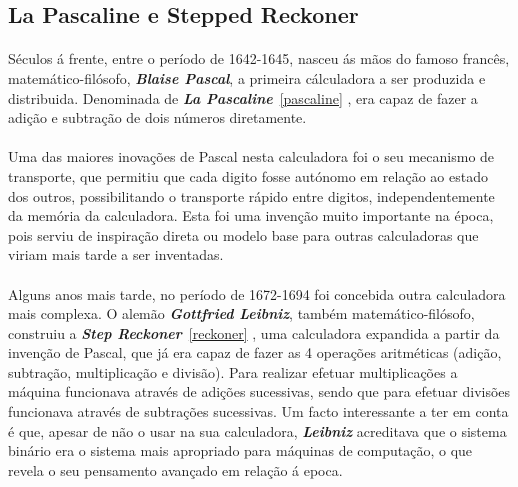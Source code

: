 \documentclass{report}
\begin{document}
\paragraph{}

\subsection{La Pascaline e Stepped Reckoner} 
\paragraph{}
Séculos á frente, entre o período de 1642-1645, nasceu ás mãos do famoso francês, matemático-filósofo, \textbf{\textit{Blaise Pascal}}, a primeira cálculadora a ser produzida e distribuida. Denominada de \textbf{\textit{La Pascaline}}~\ref{pascaline} \cite{LaPascaline}, era capaz de fazer a adição e subtração de dois números diretamente. 
\paragraph{}
Uma das maiores inovações de Pascal nesta calculadora foi o seu mecanismo de transporte, que permitiu que cada digito fosse autónomo em relação ao estado dos outros, possibilitando o transporte rápido entre digitos, independentemente da memória da calculadora.
Esta foi uma invenção muito importante na época, pois serviu de inspiração direta ou modelo base para outras calculadoras que viriam mais tarde a ser inventadas.
\paragraph{}
Alguns anos mais tarde, no período de 1672-1694 foi concebida outra calculadora mais complexa. O alemão \textbf{\textit{Gottfried Leibniz}}, também matemático-filósofo, construiu a \textbf{\textit{Step Reckoner}}~\ref{reckoner} \cite{StepReckoner}, uma calculadora expandida a partir da invenção de Pascal, que já era capaz de fazer as 4 operações aritméticas (adição, subtração, multiplicação e divisão). Para realizar efetuar multiplicações  a máquina funcionava através de adições sucessivas, sendo que para efetuar divisões funcionava através de subtrações sucessivas. \newline
Um facto interessante a ter em conta é que, apesar de não o usar na sua calculadora,  \textbf{\textit{Leibniz}} acreditava que o sistema binário era o sistema mais apropriado para máquinas de computação, o que revela o seu pensamento avançado em relação á epoca.
\end{document}
